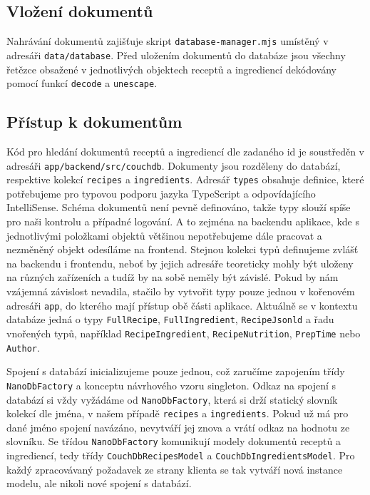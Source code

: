 \subsection{Vložení dokumentů}

Nahrávání dokumentů zajišťuje skript \texttt{database-manager.mjs} umístěný v adresáři \texttt{data/database}. Před uložením dokumentů do databáze jsou všechny řetězce obsažené v jednotlivých objektech receptů a ingrediencí dekódovány pomocí funkcí \texttt{decode} a \texttt{unescape}.

\subsection{Přístup k dokumentům}

Kód pro hledání dokumentů receptů a ingrediencí dle zadaného id je soustředěn v adresáři \texttt{app/backend/src/couchdb}. Dokumenty jsou rozděleny do databází, respektive kolekcí \texttt{recipes} a \texttt{ingredients}. Adresář \texttt{types} obsahuje definice, které potřebujeme pro typovou podporu jazyka TypeScript a odpovídajícího IntelliSense. Schéma dokumentů není pevně definováno, takže typy slouží spíše pro naši kontrolu a případné logování. A to zejména na backendu aplikace, kde s jednotlivými položkami objektů většinou nepotřebujeme dále pracovat a nezměněný objekt odesíláme na frontend. Stejnou kolekci typů definujeme zvlášť na backendu i frontendu, neboť by jejich adresáře teoreticky mohly být uloženy na různých zařízeních a tudíž by na sobě neměly být závislé. Pokud by nám vzájemná závislost nevadila, stačilo by vytvořit typy pouze jednou v kořenovém adresáři \texttt{app}, do kterého mají přístup obě části aplikace. Aktuálně se v kontextu databáze jedná o typy \texttt{FullRecipe}, \texttt{FullIngredient}, \texttt{RecipeJsonld} a řadu vnořených typů, například \texttt{RecipeIngredient}, \texttt{RecipeNutrition}, \texttt{PrepTime} nebo \texttt{Author}. 

Spojení s databází inicializujeme pouze jednou, což zaručíme zapojením třídy \texttt{NanoDbFactory} a konceptu návrhového vzoru singleton. Odkaz na spojení s databází si vždy vyžádáme od \texttt{NanoDbFactory}, která si drží statický slovník kolekcí dle jména, v našem případě \texttt{recipes} a \texttt{ingredients}. Pokud už má pro dané jméno spojení navázáno, nevytváří jej znova a vrátí odkaz na hodnotu ze slovníku. Se třídou \texttt{NanoDbFactory} komunikují modely dokumentů receptů a ingrediencí, tedy třídy \texttt{CouchDbRecipesModel} a \texttt{CouchDbIngredientsModel}. Pro každý zpracovávaný požadavek ze strany klienta se tak vytváří nová instance modelu, ale nikoli nové spojení s databází.

